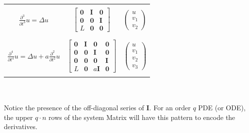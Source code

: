 {\begin{tabular}{c|c|c}
        \\\hline \hspace*{2mm} & \hspace*{2mm} 
        \\$\frac{\partial^3}{\partial t^3}u = \Delta u$ & 
        $\begin{bmatrix}
            \textbf{0} & \textbf{I} & \textbf{0}
            \\\textbf{0} & \textbf{0} & \textbf{I}
            \\ L & \textbf{0} & \textbf{0}
        \end{bmatrix}$ 
        & $\begin{pmatrix}
            u \\ v_1 \\ v_2
        \end{pmatrix}$
        \\ \hspace*{2mm} & \hspace*{2mm} 
        \\\hline \hspace*{2mm} & \hspace*{2mm} 
        \\$\frac{\partial^4}{\partial t^4}u = \Delta u + a\frac{\partial^2}{\partial t^2}u $ & 
        $\begin{bmatrix}
            \textbf{0} & \textbf{I} & \textbf{0} & \textbf{0}
            \\\textbf{0} & \textbf{0} & \textbf{I} & \textbf{0}
            \\ \textbf{0} & \textbf{0} & \textbf{0} & \textbf{I}
            \\ L & \textbf{0} & \!\!a\textbf{I} \!\!& \textbf{0}
        \end{bmatrix}$ \!
        & $\begin{pmatrix}
            u \\ v_1 \\ v_2 \\ v_3
        \end{pmatrix}$
        \\ \hspace*{2mm} & \hspace*{2mm} 
    \end{tabular}
    \\
    \\
    Notice the presence of the off-diagonal series of $\textbf{I}$. For an order $q$ PDE (or ODE), the upper $q\cdot n$ rows of the system Matrix will have this pattern to encode the derivatives.
}\noindent
